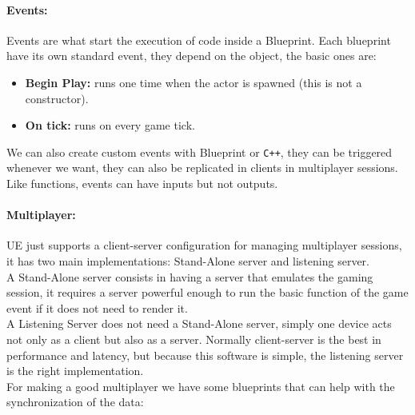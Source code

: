 \paragraph{Events:}
Events are what start the execution of code inside a Blueprint. Each blueprint have its own standard event, they depend on the object, the basic ones are:
\begin{itemize}
  \item \textbf{Begin Play:} runs one time when the actor is spawned (this is not a constructor).
  \item \textbf{On tick:} runs on every game tick.
\end{itemize}
\noindent
We can also create custom events with Blueprint or \texttt{C++}, they can be triggered whenever we want, they can also be replicated in clients in multiplayer sessions. 
Like functions, events can have inputs but not outputs.

\paragraph{Multiplayer:}
\ac{UE} just supports a client-server configuration for managing multiplayer sessions, it has two main implementations: Stand-Alone server and listening server.\\
A Stand-Alone server consists in having a server that emulates the gaming session, it requires a server powerful enough to run the basic function of the game event if it does not need to render it.\\
A Listening Server does not need a Stand-Alone server, simply one device acts not only as a client but also as a server. Normally client-server is the best in performance and latency, but because this software is simple, the listening server is the right implementation.\\
For making a good multiplayer we have some blueprints that can help with the synchronization of the data: 

